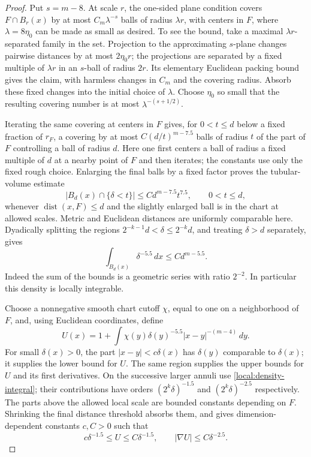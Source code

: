 \documentclass[11pt]{article}
\numberwithin{equation}{section}
\theoremstyle{definition}
\theoremstyle{remark}
\begin{document}
\begin{proof}
Put $s=m-8$.  At scale $r$, the one-sided plane condition covers
$F\cap B_r(x)$ by at most $C_m\lambda^{-s}$ balls of radius
$\lambda r$, with centers in $F$, where $\lambda=8\eta_0$ can be
made as small as desired.  To see the bound, take a maximal
$\lambda r$-separated family in the set.  Projection to the
approximating $s$-plane changes pairwise distances by at most
$2\eta_0r$; the projections are separated by a fixed multiple of
$\lambda r$ in an $s$-ball of radius $2r$.  Its elementary Euclidean
packing bound gives the claim, with harmless changes in $C_m$ and
the covering radius.  Absorb these fixed changes into the initial
choice of $\lambda$.  Choose $\eta_0$ so small that the resulting
covering number is at most $\lambda^{-(s+1/2)}$.

Iterating the same covering at centers in $F$ gives, for $0<t\le d$
below a fixed fraction of $r_F$, a covering by at most
$C(d/t)^{m-7.5}$ balls of radius $t$ of the part of $F$ controlling a
ball of radius $d$.  Here one first centers a ball of radius a fixed
multiple of $d$ at a nearby point of $F$ and then iterates; the
constants use only the fixed rough choice.  Enlarging the final
balls by a fixed factor proves the tubular-volume estimate
\begin{equation}\label{local:tube-volume}
 |B_d(x)\cap\{\delta<t\}|
       \le C d^{m-7.5}t^{7.5},\qquad 0<t\le d,
\end{equation}
whenever $\operatorname{dist}(x,F)\le d$ and the slightly enlarged ball is in the
chart at allowed scales.  Metric and Euclidean distances are
uniformly comparable here.  Dyadically splitting the regions
$2^{-k-1}d<\delta\le2^{-k}d$, and treating $\delta>d$ separately,
gives
\begin{equation}\label{local:density-integral}
 \int_{B_d(x)}\delta^{-5.5}\,dx\le C d^{m-5.5}.
\end{equation}
Indeed the sum of the bounds is a geometric series with ratio
$2^{-2}$.  In particular this density is locally integrable.

Choose a nonnegative smooth chart cutoff $\chi$, equal to one on a
neighborhood of $F$, and, using Euclidean coordinates, define
\begin{equation}\label{local:rough-potential}
 U(x)=1+\int\chi(y)\delta(y)^{-5.5}|x-y|^{-(m-4)}\,dy.
\end{equation}
For small $\delta(x)>0$, the part $|x-y|<c\delta(x)$ has
$\delta(y)$ comparable to $\delta(x)$; it supplies the lower bound
for $U$.  The same region supplies the upper bounds for $U$ and its
first derivatives.  On the successive larger annuli use
\eqref{local:density-integral}; their contributions have orders
$(2^k\delta)^{-1.5}$ and $(2^k\delta)^{-2.5}$ respectively.
The parts above the allowed local scale are bounded constants
depending on $F$.  Shrinking the final distance threshold absorbs
them, and gives dimension-dependent constants $c,C>0$ such that
\begin{equation}\label{local:rough-U-bounds}
 c\delta^{-1.5}\le U\le C\delta^{-1.5},
 \qquad |\nabla U|\le C\delta^{-2.5}.
\end{equation}


\end{proof}
\end{document}
